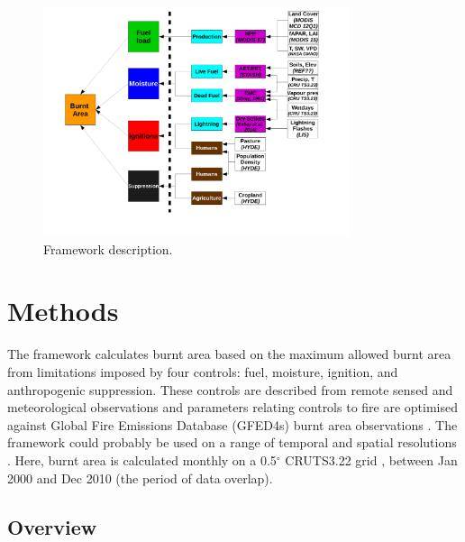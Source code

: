 \begin{figure}[!ht]
  \centering
    \includegraphics[width=0.8\textwidth]{Model_schematic.pdf}
  \caption{Framework description.}
\end{figure}


\section{Methods}
The framework calculates burnt area based on the maximum allowed burnt area from limitations imposed by four controls: fuel, moisture, ignition, and anthropogenic suppression. These controls are described from remote sensed and meteorological observations and parameters relating controls to fire are optimised against Global Fire Emissions Database (GFED4s) burnt area observations \citep{Giglio2013}.
The framework could probably be used on a range of temporal and spatial resolutions
.
Here, burnt area is calculated monthly on a 0.5$^{\circ}$ CRUTS3.22 grid \citep{harris2014cru}, between Jan 2000 and Dec 2010 (the period of data overlap).


\subsection{Overview}

